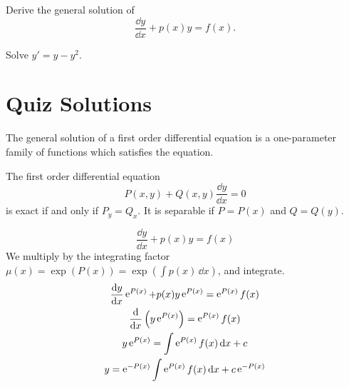 \begin{QuizProblem}
  \label{quiz problem y' + p y = f}
  Derive the general solution of
  \[
  \frac{\dd y}{\dd x} + p(x) y = f(x).
  \]

\end{QuizProblem}


\begin{QuizProblem}
  \label{quiz problem y' = y + y2}
  Solve $y' = y - y^2$.

\end{QuizProblem}








\raggedbottom
\pagebreak
\flushbottom
\section{Quiz Solutions}


\begin{QuizSolution}
  \label{quiz solution general solution first order}
  The general solution of a first order differential equation is a 
  one-parameter family of functions which satisfies the equation.
\end{QuizSolution}


\begin{QuizSolution}
  \label{quiz solution first order exact separable}
  The first order differential equation
  \[
  P(x, y) + Q(x, y) \frac{\dd y}{\dd x} = 0
  \]
  is exact if and only if $P_y = Q_x$.
  It is separable if $P = P(x)$ and $Q = Q(y)$.
\end{QuizSolution}


\begin{QuizSolution}
  \label{quiz solution y' + p y = f}
  \[
  \frac{\dd y}{\dd x} + p(x) y = f(x)
  \]
  We multiply by the integrating factor 
  $\mu(x) = \exp(P(x)) = \exp\left( \int p(x) \,\dd x \right)$, and integrate.
  \begin{gather*}
    \frac{\mathrm{d} y}{\mathrm{d} x} \mathop{\mathrm{e}}\nolimits^{P(x)} + p(x) y \mathop{\mathrm{e}}\nolimits^{P(x)} = \mathop{\mathrm{e}}\nolimits^{P(x)} f(x) 
    \\
    \frac{\mathrm{d}}{\mathrm{d} x} \left( y \mathop{\mathrm{e}}\nolimits^{P(x)} \right) = \mathop{\mathrm{e}}\nolimits^{P(x)} f(x) 
    \\
    y \mathop{\mathrm{e}}\nolimits^{P(x)} = \int \mathop{\mathrm{e}}\nolimits^{P(x)} f(x)\,\mathrm{d} x + c 
    \\
    y = \mathop{\mathrm{e}}\nolimits^{-P(x)} \int \mathop{\mathrm{e}}\nolimits^{P(x)} f(x)\,\mathrm{d} x + c \mathop{\mathrm{e}}\nolimits^{-P(x)}
  \end{gather*}
\end{QuizSolution}


